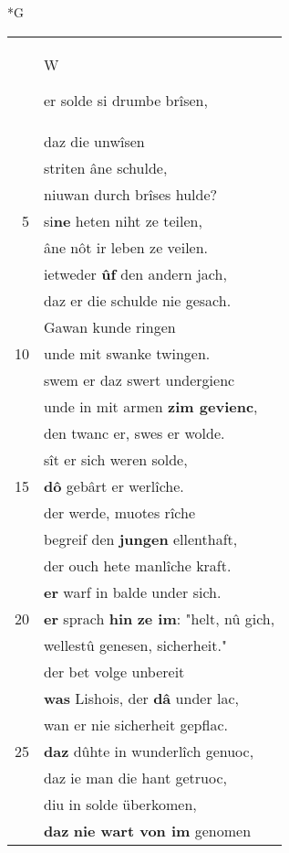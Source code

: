 \documentclass[8pt,a4paper,notitlepage]{article}
\begin{document}
\begin{table}[ht]
\begin{minipage}[t]{0.5\linewidth}
\small
\begin{center}*G
\end{center}
\begin{tabular}{rl}
 & \begin{large}W\end{large}er solde si drumbe brîsen,\\ 
 & daz die unwîsen\\ 
 & striten âne schulde,\\ 
 & niuwan durch brîses hulde?\\ 
5 & si\textbf{ne} heten niht ze teilen,\\ 
 & âne nôt ir leben ze veilen.\\ 
 & ietweder \textbf{ûf} den andern jach,\\ 
 & daz er die schulde nie gesach.\\ 
 & Gawan kunde ringen\\ 
10 & unde mit swanke twingen.\\ 
 & swem er daz swert undergienc\\ 
 & unde in mit armen \textbf{zim gevienc},\\ 
 & den twanc er, swes er wolde.\\ 
 & sît er sich weren solde,\\ 
15 & \textbf{dô} gebârt er werlîche.\\ 
 & der werde, muotes rîche\\ 
 & begreif den \textbf{jungen} ellenthaft,\\ 
 & der ouch hete manlîche kraft.\\ 
 & \textbf{er} warf in balde under sich.\\ 
20 & \textbf{er} sprach \textbf{hin} \textbf{ze im}: "helt, nû gich,\\ 
 & wellestû genesen, sicherheit."\\ 
 & der bet volge unbereit\\ 
 & \textbf{was} Lishois, der \textbf{dâ} under lac,\\ 
 & wan er nie sicherheit gepflac.\\ 
25 & \textbf{daz} dûhte in wunderlîch genuoc,\\ 
 & daz ie man die hant getruoc,\\ 
 & diu in solde überkomen,\\ 
 & \textbf{daz} \textbf{nie wart von im} genomen\\ 

\end{tabular}
\end{minipage}
\end{table}
\end{document}
